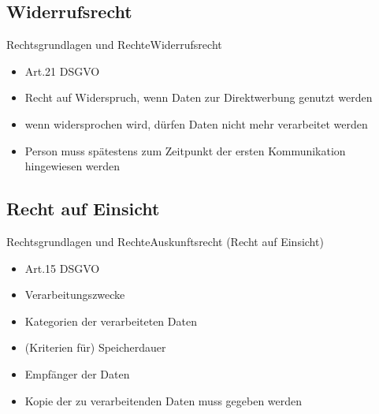 \documentclass[9pt]{beamer}
\begin{document}
        \subsection{Widerrufsrecht}
            \begin{frame}{Rechtsgrundlagen und Rechte}{Widerrufsrecht}
                \begin{itemize}
                    \item Art.21 DSGVO
            		\item Recht auf Widerspruch, wenn Daten zur Direktwerbung genutzt werden
            		\item wenn widersprochen wird, dürfen Daten nicht mehr verarbeitet werden
            		\item Person muss spätestens zum Zeitpunkt der ersten Kommunikation hingewiesen werden
            	\end{itemize}
            \end{frame}


        \subsection{Recht auf Einsicht}
            \begin{frame}{Rechtsgrundlagen und Rechte}{Auskunftsrecht (Recht auf Einsicht)}
                \begin{itemize}
                \item Art.15 DSGVO
            		\item Verarbeitungszwecke
            		\item Kategorien der verarbeiteten Daten
            		\item (Kriterien für) Speicherdauer
            		\item Empfänger der Daten
            		\item Kopie der zu verarbeitenden Daten muss gegeben werden
            	\end{itemize}
            \end{frame}
\end{document}
